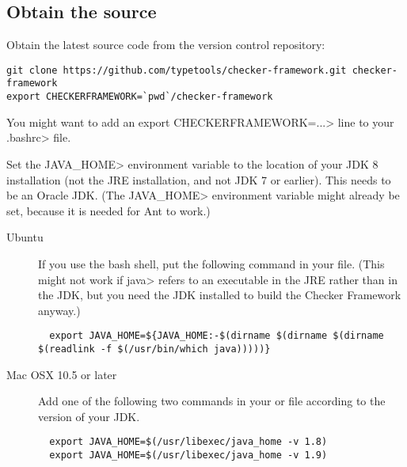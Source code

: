 \subsection{Obtain the source\label{building-obtain-source}}

Obtain the latest source code from the version control repository:

\begin{Verbatim}
git clone https://github.com/typetools/checker-framework.git checker-framework
export CHECKERFRAMEWORK=`pwd`/checker-framework
\end{Verbatim}

You might want to add an \<export CHECKERFRAMEWORK=...> line to your
\<.bashrc> file.

Set the \<JAVA\_HOME> environment variable to the location of your JDK
8 installation (not the JRE installation, and not JDK 7 or earlier).
This needs to be an Oracle JDK.
(The \<JAVA\_HOME> environment
variable might already be set, because it is needed for Ant to work.)

\begin{description}
\item[Ubuntu]
If you use the bash shell, put the following command in your
 file.  (This might not work if \<java> refers to an executable
in the JRE rather than in the JDK, but you need the JDK installed to build
the Checker Framework anyway.)
\begin{smaller}
\begin{Verbatim}
  export JAVA_HOME=${JAVA_HOME:-$(dirname $(dirname $(dirname $(readlink -f $(/usr/bin/which java)))))}
\end{Verbatim}
\end{smaller}

\item[Mac OSX 10.5 or later]
  Add one of the following two commands in your  or
   file according to the version of your JDK.
\begin{Verbatim}
  export JAVA_HOME=$(/usr/libexec/java_home -v 1.8)
  export JAVA_HOME=$(/usr/libexec/java_home -v 1.9)
\end{Verbatim}

\end{description}

